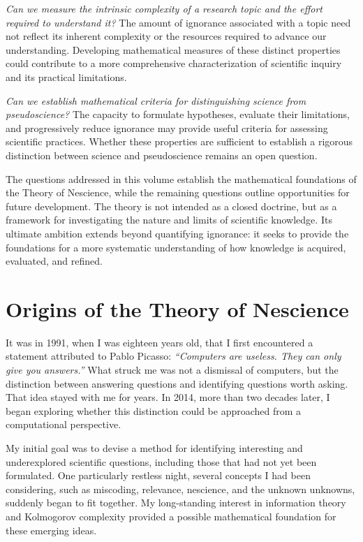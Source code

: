 \emph{Can we measure the intrinsic complexity of a research topic and the effort required to understand it?} The amount of ignorance associated with a topic need not reflect its inherent complexity or the resources required to advance our understanding. Developing mathematical measures of these distinct properties could contribute to a more comprehensive characterization of scientific inquiry and its practical limitations.

\emph{Can we establish mathematical criteria for distinguishing science from pseudoscience?} The capacity to formulate hypotheses, evaluate their limitations, and progressively reduce ignorance may provide useful criteria for assessing scientific practices. Whether these properties are sufficient to establish a rigorous distinction between science and pseudoscience remains an open question.

The questions addressed in this volume establish the mathematical foundations of the Theory of Nescience, while the remaining questions outline opportunities for future development. The theory is not intended as a closed doctrine, but as a framework for investigating the nature and limits of scientific knowledge. Its ultimate ambition extends beyond quantifying ignorance: it seeks to provide the foundations for a more systematic understanding of how knowledge is acquired, evaluated, and refined.


\section*{Origins of the Theory of Nescience}

It was in 1991, when I was eighteen years old, that I first encountered a statement attributed to Pablo Picasso: \emph{``Computers are useless. They can only give you answers.''} What struck me was not a dismissal of computers, but the distinction between answering questions and identifying questions worth asking. That idea stayed with me for years. In 2014, more than two decades later, I began exploring whether this distinction could be approached from a computational perspective.

My initial goal was to devise a method for identifying interesting and underexplored scientific questions, including those that had not yet been formulated. One particularly restless night, several concepts I had been considering, such as miscoding, relevance, nescience, and the unknown unknowns, suddenly began to fit together. My long-standing interest in information theory and Kolmogorov complexity provided a possible mathematical foundation for these emerging ideas.

